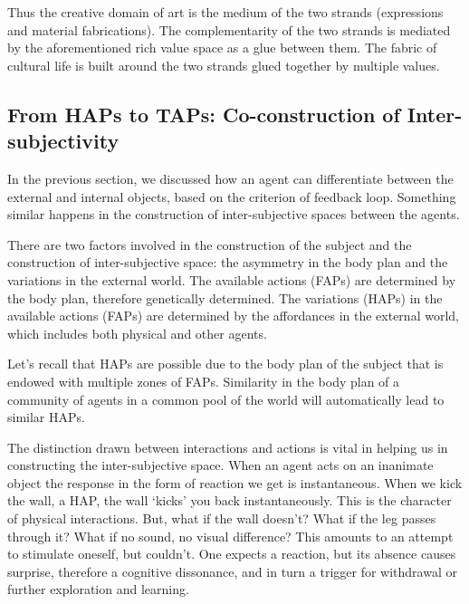 Thus the creative domain of art is the medium of the two strands (expressions and material fabrications). The complementarity of the two strands is mediated by the aforementioned rich value space as a glue between them. The fabric of cultural life is built around the two strands glued together by multiple values.

\subsection{From HAPs to TAPs: Co-construction of Inter-subjectivity}
In the previous section, we discussed how an agent can differentiate between the external and internal objects, based on the criterion of feedback loop. Something similar happens in the construction of inter-subjective spaces between the agents.

There are two factors involved in the construction of the subject and the construction of inter-subjective space: the asymmetry in the body plan and the variations in the external world. The available actions (FAPs) are determined by the body plan, therefore genetically determined. The variations (HAPs) in the available actions (FAPs) are determined by the affordances in the external world, which includes both physical and other agents.

Let's recall that HAPs are possible due to the body plan of the subject that is endowed with multiple zones of FAPs. Similarity in the body plan of a community of agents in a common pool of the world will automatically lead to similar HAPs.

The distinction drawn between interactions and actions is vital in helping us in constructing the inter-subjective space. When an agent acts on an inanimate object the response in the form of reaction we get is instantaneous. When we kick the wall, a HAP, the wall `kicks' you back instantaneously. This is the character of physical interactions.  But, what if the wall doesn't? What if the leg passes through it? What if no sound, no visual difference?  This amounts to an attempt to stimulate oneself, but couldn't. One expects a reaction, but its absence causes surprise, therefore a cognitive dissonance, and in turn a trigger for withdrawal or further exploration and learning.

